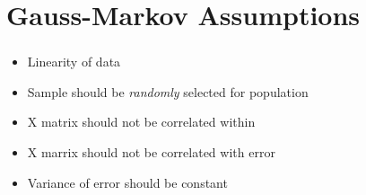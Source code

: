 \documentclass[t, 11pt]{beamer}
\begin{document}
\section{Gauss-Markov Assumptions}

\begin{frame}
	\frametitle{\insertsection} 
	\framesubtitle{\insertsubsection} 
	
	\begin{itemize}
		\item Linearity of data
		\item Sample should be \emph{randomly} selected for population
		\item X matrix should not be correlated within
		\item X marrix should not be correlated with error
		\item Variance of error should be constant
	\end{itemize}

	
	
\end{frame}	
\end{document}
